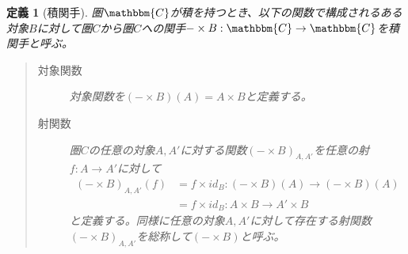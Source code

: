\documentclass[uplatex,dvipdfmx]{jsarticle}
\newcommand{\cat}[1]{\mathbbm{#1}}
\newcommand{\arrow}{\rightarrow}
\newcommand{\functor}[3]{#1:\cat{#2}\arrow \cat{#3}}
\newcommand{\mor}[3]{#1:#2\arrow #3}
\newtheorem{define}{定義}[section]
\numberwithin{proof}{subsection}
\numberwithin{prop}{subsection}
\numberwithin{define}{subsection}
\begin{document}
	\begin{define}[積関手]
		圏$\cat{C}$が積を持つとき、以下の関数で構成されるある対象$B$に対して圏$C$から圏$C$への関手$\functor{-\times B}{C}{C}$を積関手と呼ぶ。
		\begin{quote}
			\begin{description}
			\item[対象関数] 対象関数を$(-\times B)(A)=A\times B$と定義する。
			\item[射関数] 圏$C$の任意の対象$A,A'$に対する関数$(-\times B)_{A,A'}$を任意の射$\mor{f}{A}{A'}$に対して
			\begin{align*}
				(-\times B)_{A,A'}(f)&=\mor{f\times id_B}{(-\times B)(A)}{(-\times B)(A)}\\
				&=\mor{f\times id_B}{A\times B}{A'\times B}
			\end{align*}
			と定義する。同様に任意の対象$A,A'$に対して存在する射関数$(-\times B)_{A,A'}$を総称して$(-\times B)$と呼ぶ。
			\begin{center}
\end{center}
\end{description}
\end{quote}
\end{define}
\end{document}
